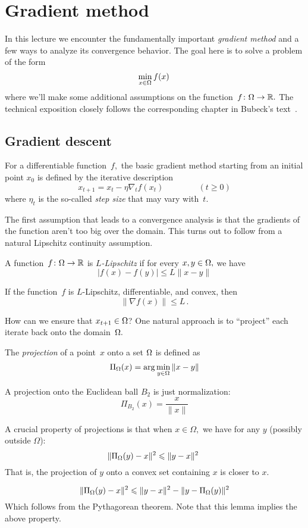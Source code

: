 \section{Gradient method}

In this lecture we encounter the fundamentally important \emph{gradient method}
and a few ways to analyze its convergence behavior.
The goal here is to solve a problem of the form
\[
\min_{x\in\Omega} f(x)\,
\]
where we'll make some additional assumptions on the
function~$f\colon\Omega\to\mathbb{R}.$ The technical exposition closely follows the
corresponding chapter in Bubeck's text~\cite{Bubeck}.

\subsection{Gradient descent}

For a differentiable function~$f,$ the basic gradient method starting from an
initial point $x_0$ is defined by the iterative description
\[
x_{t+1} = x_t - \eta \nabla_t f(x_t)\,\qquad\qquad(t\ge 0)
\]
where $\eta_t$ is the so-called \emph{step size} that may vary with~$t.$

The first assumption that leads to a convergence analysis is that the gradients
of the function aren't too big over the domain. This turns out to follow from a
natural Lipschitz continuity assumption.

\begin{definition}[$L$-Lipschitz]
A function~$f\colon\Omega\to\mathbb{R}$ is \emph{$L$-Lipschitz} if for every
$x,y\in\Omega,$ we have
\[
|f(x) - f(y)| \leq L \|x - y\|
\]
\end{definition}

\begin{fact}
If the function~$f$ is $L$-Lipschitz, differentiable, and convex, then
\[
\|\nabla f(x)\| \leq L\,.
\]
\end{fact}

How can we ensure that $x_{t+1}\in\Omega$?  One natural approach is to
``project'' each iterate back onto the domain~$\Omega.$

\begin{definition}[Projection]
The \emph{projection} of a point~$x$ onto a set $\Omega$ is defined as
\[
\Pi_{\Omega}(x) = \arg\min_{y\in\Omega} \|x-y\|
\]
\end{definition}

\begin{example}
A projection onto the Euclidean ball $B_2$ is just normalization:
\[
\Pi_{B_2}(x) = \dfrac{x}{\|x\|}
\]
\end{example}
%
A crucial property of projections is that when $x\in\Omega,$ we have for any $y$
(possibly outside $\Omega$):
\[
\| \Pi_{\Omega}(y) - x \|^2 \leqslant \| y - x \|^2\
\]
That is, the projection of $y$ onto a convex set containing $x$ is closer to $x$. 
%
\begin{lemma}
\[
\| \Pi_{\Omega}(y) - x \|^2 \leqslant \| y - x \|^2 - \| y - \Pi_{\Omega}(y) \|^2
\]
Which follows from the Pythagorean theorem. Note that this lemma implies the above property.
\end{lemma}

